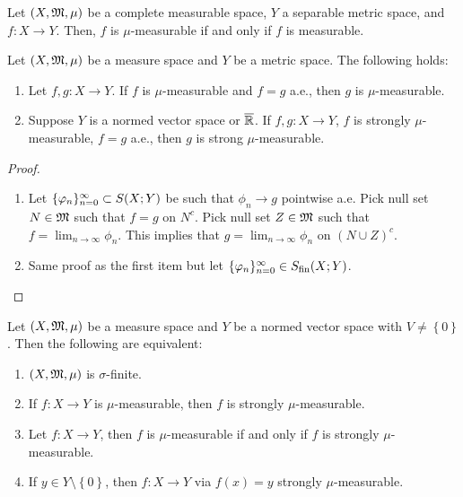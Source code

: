 \documentclass[a4paper]{article}
\begin{document}
\begin{cor}
  Let $(X, \mathfrak{M}, \mu)$ be a complete measurable space,
  $Y$ a separable metric space, and $f: X \to Y$.
  Then, $f$ is $\mu$-measurable if and only if
  $f$ is measurable.
\end{cor}

\begin{prop}
  Let $(X, \mathfrak{M}, \mu)$ be a measure space and $Y$ be a metric
  space. The following holds:
  \begin{enumerate}
    \item Let $f, g: X \to Y$. If $f$ is $\mu$-measurable
    and $f = g$ a.e., then $g$ is $\mu$-measurable.

    \item Suppose $Y$ is a normed vector space or
    $\overline{\mathbb{R}}$. If $f, g: X \to Y$, $f$ is strongly
    $\mu$-measurable, $f = g$ a.e., then
    $g$ is strong $\mu$-measurable.
  \end{enumerate}
\end{prop}

\begin{proof}
  \begin{enumerate}
    \item Let $\{ \varphi_n \}_{n=0}^\infty \subset S(X; Y)$ be such that
    $\phi_n \to g$ pointwise a.e. Pick null set
    $N \in \mathfrak{M}$ such that $f = g$ on $N^c$. Pick
    null set $Z \in \mathfrak{M}$ such that $f = \lim_{n \to \infty}
    \phi_n$. This implies that
    $g = \lim_{n \to \infty} \phi_n$ on $(N \cup Z)^c$.

    \item Same proof as the first item but let
    $\{ \varphi_n \}_{n=0}^\infty \in S_{\text{fin}}(X; Y)$.
  \end{enumerate}

\end{proof}

\begin{thm}
  Let $(X,\mathfrak{M}, \mu)$ be a measure space and
  $Y$ be a normed vector space with $V \neq \left\{ 0
  \right\}$. Then the following are equivalent:
  \begin{enumerate}
    \item $(X, \mathfrak{M}, \mu)$ is $\sigma$-finite.
    \item If $f: X \to Y$ is $\mu$-measurable, then
    $f$ is strongly $\mu$-measurable.
    \item Let $f: X \to Y$, then $f$ is $\mu$-measurable
    if and only if $f$ is strongly $\mu$-measurable.
    \item If $y \in Y \setminus \left\{ 0 \right\}$,
    then $f: X \to Y$ via $f(x) = y$ strongly
    $\mu$-measurable.
  \end{enumerate}
\end{thm}
\end{document}
